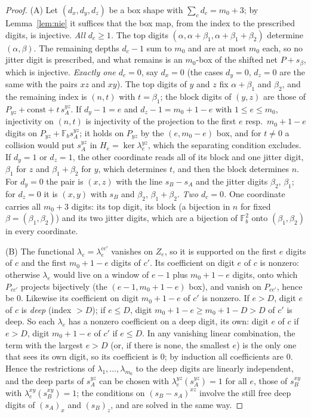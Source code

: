 \documentclass[11pt]{amsart}
\theoremstyle{definition}
\theoremstyle{plain}
\newcommand{\F}{\mathbb{F}}
\begin{document}
\begin{proof}
(A) Let $(d_x,d_y,d_z)$ be a box shape with $\sum_cd_c=m_0+3$; by Lemma~\ref{lem:nie} it suffices that the box map, from the index to the prescribed digits, is injective. \emph{All $d_c\ge1$.} The top digits $(\alpha,\alpha+\beta_1,\alpha+\beta_1+\beta_2)$ determine $(\alpha,\beta)$. The remaining depths $d_c-1$ sum to $m_0$ and are at most $m_0$ each, so no jitter digit is prescribed, and what remains is an $m_0$-box of the shifted net $P+s_\beta$, which is injective. \emph{Exactly one $d_c=0$}, say $d_x=0$ (the cases $d_y=0$, $d_z=0$ are the same with the pairs $xz$ and $xy$). The top digits of $y$ and $z$ fix $\alpha+\beta_1$ and $\beta_2$, and the remaining index is $(n,t)$ with $t=\beta_1$; the block digits of $(y,z)$ are those of $P_{yz}+\text{const}+t\,s_A^{yz}$. If $d_y-1=e$ and $d_z-1=m_0+1-e$ with $1\le e\le m_0$, injectivity on $(n,t)$ is injectivity of the projection to the first $e$ resp.\ $m_0+1-e$ digits on $P_{yz}+\F_bs_A^{yz}$; it holds on $P_{yz}$ by the $(e,m_0-e)$ box, and for $t\ne0$ a collision would put $s_A^{yz}$ in $H_e=\ker\lambda^{yz}_e$, which the separating condition excludes. If $d_y=1$ or $d_z=1$, the other coordinate reads all of its block and one jitter digit, $\beta_1$ for $z$ and $\beta_1+\beta_2$ for $y$, which determines $t$, and then the block determines $n$. For $d_y=0$ the pair is $(x,z)$ with the line $s_B-s_A$ and the jitter digits $\beta_2$, $\beta_1$; for $d_z=0$ it is $(x,y)$ with $s_B$ and $\beta_2$, $\beta_1+\beta_2$. \emph{Two $d_c=0$.} One coordinate carries all $m_0+3$ digits: its top digit, its block (a bijection in $n$ for fixed $\beta=(\beta_1,\beta_2)$) and its two jitter digits, which are a bijection of $\F_b^2$ onto $(\beta_1,\beta_2)$ in every coordinate.

(B) The functional $\lambda_e=\lambda^{cc'}_e$ vanishes on $Z_e$, so it is supported on the first $e$ digits of $c$ and the first $m_0+1-e$ digits of $c'$. Its coefficient on digit $e$ of $c$ is nonzero: otherwise $\lambda_e$ would live on a window of $e-1$ plus $m_0+1-e$ digits, onto which $P_{cc'}$ projects bijectively (the $(e-1,m_0+1-e)$ box), and vanish on $P_{cc'}$, hence be $0$. Likewise its coefficient on digit $m_0+1-e$ of $c'$ is nonzero. If $e>D$, digit $e$ of $c$ is \emph{deep} (index $>D$); if $e\le D$, digit $m_0+1-e\ge m_0+1-D>D$ of $c'$ is deep. So each $\lambda_e$ has a nonzero coefficient on a deep digit, its own: digit $e$ of $c$ if $e>D$, digit $m_0+1-e$ of $c'$ if $e\le D$. In any vanishing linear combination, the term with the largest $e>D$ (or, if there is none, the smallest $e$) is the only one that sees its own digit, so its coefficient is $0$; by induction all coefficients are $0$. Hence the restrictions of $\lambda_1,\dots,\lambda_{m_0}$ to the deep digits are linearly independent, and the deep parts of $s_A^{yz}$ can be chosen with $\lambda^{yz}_e(s_A^{yz})=1$ for all $e$, those of $s_B^{xy}$ with $\lambda^{xy}_e(s_B^{xy})=1$; the conditions on $(s_B-s_A)^{xz}$ involve the still free deep digits of $(s_A)_x$ and $(s_B)_z$, and are solved in the same way.
\end{proof}
\end{document}

